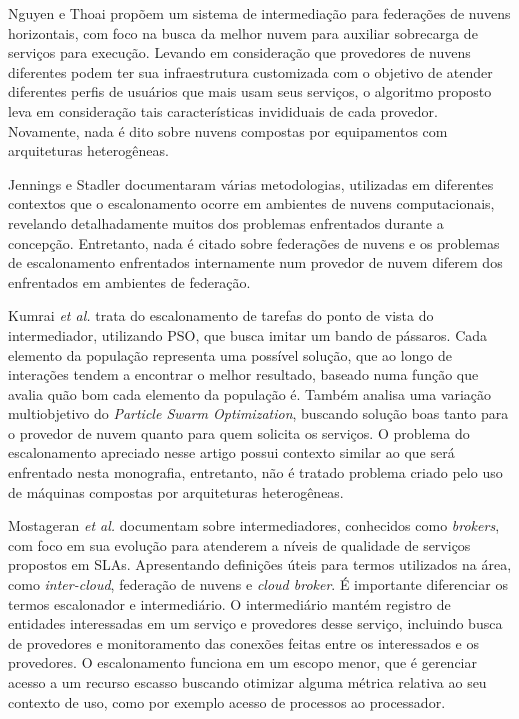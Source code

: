 Nguyen e Thoai \cite{7791859} propõem um sistema de intermediação para federações de nuvens horizontais, com foco na busca da melhor nuvem para auxiliar sobrecarga de serviços para execução. Levando em consideração que provedores de nuvens diferentes podem ter sua infraestrutura customizada com o objetivo de atender diferentes perfis de usuários que mais usam seus serviços, o algoritmo proposto leva em consideração tais características invididuais de cada provedor. Novamente, nada é dito sobre nuvens compostas por equipamentos com arquiteturas heterogêneas.

Jennings e Stadler \cite{Jennings:2015:RMC:2793474.2793493} documentaram  várias metodologias, utilizadas em diferentes contextos que o escalonamento ocorre em ambientes de nuvens computacionais, revelando detalhadamente muitos dos problemas enfrentados durante a concepção. Entretanto, nada é citado sobre federações de nuvens e os problemas de escalonamento enfrentados internamente num provedor de nuvem diferem dos enfrentados em ambientes de federação.

Kumrai \textit{et al.} \cite{7467407} trata do escalonamento de tarefas do ponto de vista do intermediador, utilizando \acrfull{PSO}, que busca imitar um bando de pássaros. Cada elemento da população representa uma possível solução, que ao longo de interações tendem a encontrar o melhor resultado, baseado numa função que avalia quão bom cada elemento da população é. Também analisa uma variação multiobjetivo do \textit{Particle Swarm Optimization}, buscando solução boas tanto para o provedor de nuvem quanto para quem solicita os serviços. O problema do escalonamento apreciado nesse artigo possui contexto similar ao que será enfrentado nesta monografia, entretanto, não é tratado problema criado pelo uso de máquinas compostas por arquiteturas heterogêneas.

Mostageran \textit{et al.} \cite{7224588} documentam sobre intermediadores, conhecidos como \textit{brokers}, com foco em sua evolução para atenderem a níveis de qualidade de serviços propostos em \acrshort{SLA}s. Apresentando definições úteis para termos utilizados na área, como \textit{inter-cloud}, federação de nuvens e \textit{cloud broker}. É importante diferenciar os termos escalonador e intermediário. O intermediário mantém registro de entidades interessadas em um serviço e provedores desse serviço, incluindo busca de provedores e monitoramento das conexões feitas entre os interessados e os provedores. O escalonamento funciona em um escopo menor, que é gerenciar acesso a um recurso escasso buscando otimizar alguma métrica relativa ao seu contexto de uso, como por exemplo acesso de processos ao processador.

